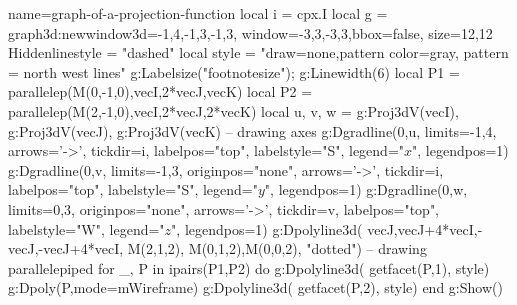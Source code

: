 \documentclass[border=5pt]{standalone}%
\begin{document}
\begin{luadraw}{name=graph-of-a-projection-function}
local i = cpx.I
local g = graph3d:new{window3d={-1,4,-1,3,-1,3}, window={-3,3,-3,3},bbox=false, size={12,12}}
Hiddenlinestyle = "dashed"
local style = "draw=none,pattern color=gray, pattern = north west lines"
g:Labelsize("footnotesize"); g:Linewidth(6)
local P1 = parallelep(M(0,-1,0),vecI,2*vecJ,vecK)
local P2 = parallelep(M(2,-1,0),vecI,2*vecJ,2*vecK)
local u, v, w = g:Proj3dV(vecI), g:Proj3dV(vecJ), g:Proj3dV(vecK)
-- drawing axes
g:Dgradline({0,u}, {limits={-1,4}, arrows='->', tickdir=i, labelpos="top", labelstyle="S", legend="$x$", legendpos=1})
g:Dgradline({0,v}, {limits={-1,3}, originpos="none", arrows='->', tickdir=i, labelpos="top", labelstyle="S", legend="$y$", legendpos=1})
g:Dgradline({0,w}, {limits={0,3}, originpos="none", arrows='->', tickdir=v, labelpos="top", labelstyle="W", legend="$z$", legendpos=1})
g:Dpolyline3d( {{vecJ,vecJ+4*vecI},{-vecJ,-vecJ+4*vecI}, {M(2,1,2), M(0,1,2),M(0,0,2)}}, "dotted")
-- drawing parallelepiped
for _, P in ipairs({P1,P2}) do
    g:Dpolyline3d( getfacet(P,1), style)
    g:Dpoly(P,{mode=mWireframe})
    g:Dpolyline3d( getfacet(P,2), style)
end
g:Show()
\end{luadraw}
\end{document}
